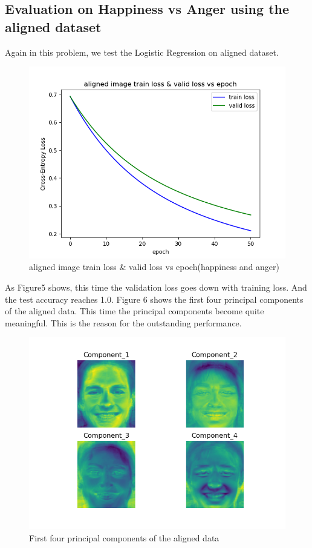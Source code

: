 \documentclass{article} %
\begin{document}
\subsection {Evaluation on Happiness vs Anger using the aligned dataset}
Again in this problem, we test the Logistic Regression on aligned dataset.
\begin{figure}[h]
	\centering
	\includegraphics[scale=0.5]{./graph/aligned_tvloss.png}
	\caption{aligned image train loss \& valid loss vs epoch(happiness and anger)}
\end{figure}
As Figure5 shows, this time the validation loss goes down with training loss. And the test accuracy reaches 1.0. Figure 6 shows the first four principal components of the aligned data. This time the principal components become quite meaningful. This is the reason for the outstanding performance.
\begin{figure}[h]
	\centering
	\includegraphics[scale=0.5]{./graph/pca_aligned.png}
	\caption{First four principal components of the aligned data}
\end{figure}
\end{document}
